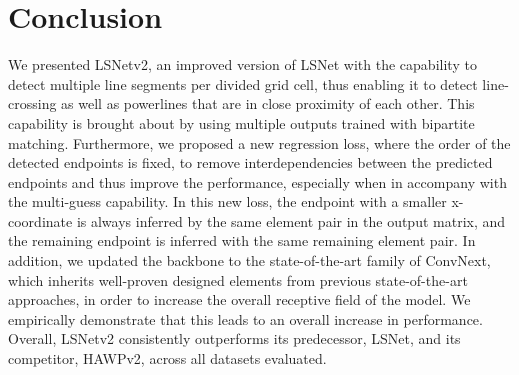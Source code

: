 \documentclass[journal]{IEEEtran}
\begin{document}
\section{Conclusion}
We presented LSNetv2, an improved version of LSNet with the capability to detect multiple line segments per divided grid cell, thus enabling it to detect line-crossing as well as powerlines that are in close proximity of each other.  This capability is brought about by using multiple outputs trained with bipartite matching. Furthermore, we proposed a new regression loss, where the order of the detected endpoints is fixed, to remove interdependencies between the predicted endpoints and thus improve the performance, especially when in accompany with the multi-guess capability. In this new loss, the endpoint with a smaller x-coordinate is always inferred by the same element pair in the output matrix, and the remaining endpoint is inferred with the same remaining element pair. In addition, we updated the backbone to the state-of-the-art family of ConvNext, which inherits well-proven designed elements from previous state-of-the-art approaches, in order to increase the overall receptive field of the model. We empirically demonstrate that this leads to an overall increase in performance.
Overall, LSNetv2 consistently outperforms its predecessor, LSNet, and its competitor, HAWPv2, across all datasets evaluated. %








%
\end{document}
